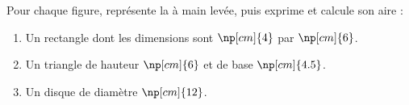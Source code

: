 \documentclass{classe-tex3R}
\begin{document}
\newpage



\setcounter{compteurexercice}{1}


\begin{enonce}
Pour chaque figure, représente la à main levée, puis exprime et calcule son aire :

  	\begin{enumerate}[leftmargin=*]
			\item Un rectangle dont les dimensions sont $\np[cm]{4}$ par $\np[cm]{6}$.
			

\dotfill

\medskip

\dotfill

\medskip

\dotfill

\medskip

\dotfill

			
			\item Un triangle de hauteur $\np[cm]{6}$ et de base $\np[cm]{4.5}$.
			      

\dotfill

\medskip

\dotfill

\medskip

\dotfill

\medskip

\dotfill


			\item Un disque de diamètre $\np[cm]{12}$.
			

\dotfill

\medskip

\dotfill

\medskip

\dotfill

\medskip

\dotfill

	\end{enumerate}
\end{enonce}


\vfill

\setcounter{compteurexercice}{1}

\end{document}
